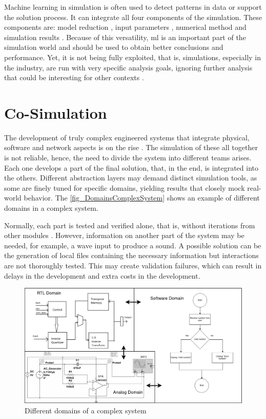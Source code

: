 Machine learning in simulation is often used to detect patterns in data or support the solution process. It can integrate all four components 
of the simulation. These components are: model reduction \cite{benner2015survey}, input parameters \cite{tsymbalov2019deeper}, numerical 
method \cite{noe2020machine} and simulation results \cite{albertsson2018machine}. Because of this versatility, \gls{ml} is an important part 
of the simulation world and should be used to obtain better conclusions and performance. Yet, it is not being fully exploited, that is, 
simulations, especially in the industry, are run with very specific analysis goals, ignoring further analysis that could be interesting for 
other contexts \cite{von2020combining}.

\section{Co-Simulation}

The development of truly complex engineered systems that integrate physical, software and network aspects is on the rise \cite{gomes2017co}. 
The simulation of these all together is not reliable, hence, the need to divide the system into different teams arises. Each one develops a 
part of the final solution, that, in the end, is integrated into the others. Different abstraction layers may demand distinct simulation tools, 
as some are finely tuned for specific domains, yielding results that closely mock real-world behavior. The \autoref{fig_DomainsComplexSystem} 
shows an example of different domains in a complex system. 

Normally, each part is tested and verified alone, that is, without iterations from other modules \cite{gomes2017co}. However, information on 
another part of the system may be needed, for example, a wave input to produce a sound. A possible solution can be the generation of local 
files containing the necessary information but interactions are not thoroughly tested. This may create validation failures, which 
can result in delays in the development and extra costs in the development.

\begin{figure}[]
	\centering
 	\includegraphics[width=0.9\linewidth]{Images/DomainsComplexSystem.png}
 	\caption{Different domains of a complex system}
	 \label{fig_DomainsComplexSystem}
\end{figure}

